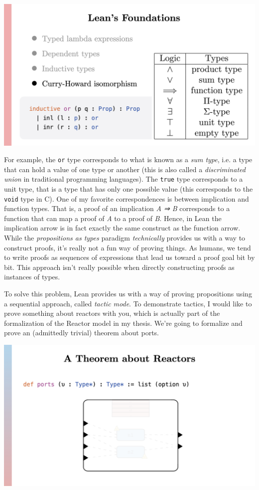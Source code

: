 \documentclass{article}
\begin{document}
\begin{center}
  \includegraphics[width=\columnwidth]{Slides/Slide 8.jpeg}
\end{center}

For example, the \lstinline{or} type corresponds to what is known as a
\emph{sum type}, i.e. a type that can hold a value of one type or
another (this is also called a \emph{discriminated union} in traditional
programming languages). The \lstinline{true} type corresponds to a unit
type, that is a type that has only one possible value (this corresponds
to the \lstinline{void} type in C). One of my favorite correspondences is
between implication and function types. That is, a proof of an
implication \emph{A ⇒ B} corresponds to a function that can map a proof
of \emph{A} to a proof of \emph{B}. Hence, in Lean the implication arrow
is in fact exactly the same construct as the function arrow. While the
\emph{propositions as types} paradigm \emph{technically} provides us
with a way to construct proofs, it's really not a fun way of proving
things. As humans, we tend to write proofs as sequences of expressions
that lead us toward a proof goal bit by bit. This approach isn't really
possible when directly constructing proofs as instances of types.

To solve this problem, Lean provides us with a way of proving
propositions using a sequential approach, called \emph{tactic mode}. To
demonstrate tactics, I would like to prove something about reactors with
you, which is actually part of the formalization of the Reactor model in
my thesis. We're going to formalize and prove an (admittedly trivial)
theorem about ports.

\begin{center}
  \includegraphics[width=\columnwidth]{Slides/Slide 9.jpeg}
\end{center}
\end{document}
